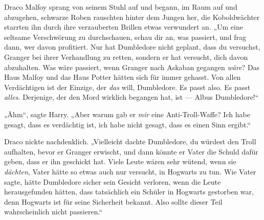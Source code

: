 Draco Malfoy sprang von seinem Stuhl auf und begann, im Raum auf und abzugehen, schwarze Roben rauschten hinter dem Jungen her, die Koboldwächter starrten ihn durch ihre verzauberten Brillen etwas verwundert an.
„Um eine seltsame Verschwörung zu durchschauen, schau dir an, was passiert, und frag dann, wer davon profitiert. Nur hat Dumbledore nicht geplant, dass du versuchst, Granger bei ihrer Verhandlung zu retten, sondern er hat versucht, dich davon abzuhalten. Was wäre passiert, wenn Granger nach Askaban gegangen \emph{wäre}? Das Haus Malfoy und das Haus Potter hätten sich für immer gehasst. Von allen Verdächtigen ist der Einzige, der \emph{das} will, Dumbledore. Es passt also. Es passt \emph{alles}. Derjenige, der den Mord wirklich begangen hat, ist — Albus Dumbledore!“

„Ähm“, sagte Harry.
„Aber warum gab er \emph{mir} eine Anti-Troll-Waffe? Ich habe gesagt, dass es verdächtig ist, ich habe nicht gesagt, dass es einen Sinn ergibt.“

Draco nickte nachdenklich.
„Vielleicht dachte Dumbledore, du würdest den Troll aufhalten, bevor er Granger erwischt, und dann könnte er Vater die Schuld dafür geben, dass er ihn geschickt hat. Viele Leute wären sehr wütend, wenn sie \emph{dächten}, Vater hätte so etwas auch nur versucht, in Hogwarts zu tun. Wie Vater sagte, hätte Dumbledore sicher sein Gesicht verloren, wenn die Leute herausgefunden hätten, dass tatsächlich ein Schüler in Hogwarts gestorben war, denn Hogwarts ist für seine Sicherheit bekannt. Also sollte dieser Teil wahrscheinlich nicht passieren.“

